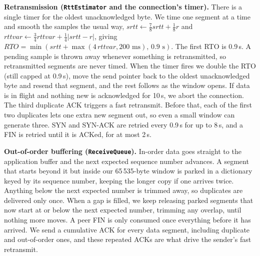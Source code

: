\documentclass[10pt,a4paper]{article}
\newcommand{\cmd}[1]{\texttt{#1}}
\begin{document}
\textbf{Retransmission (\cmd{RttEstimator} and the connection's timer).}
There is a single timer for the oldest unacknowledged byte. We time one segment at a time and
smooth the samples the usual way, $\mathit{srtt}\leftarrow\frac78\mathit{srtt}+\frac18 r$ and
$\mathit{rttvar}\leftarrow\frac34\mathit{rttvar}+\frac14|\mathit{srtt}-r|$, giving
$\mathit{RTO}=\min(\mathit{srtt}+\max(4\,\mathit{rttvar},200\text{ ms}),\,0.9\text{ s})$. The first RTO
is 0.9\,s. A pending sample is thrown away whenever something is retransmitted, so retransmitted
segments are never timed. When the timer fires we double the RTO (still capped at 0.9\,s), move
the send pointer back to the oldest unacknowledged byte and resend that segment, and the rest
follows as the window opens. If data is in flight and nothing new is acknowledged for 10\,s, we
abort the connection. The third duplicate ACK triggers a fast retransmit. Before that, each of the
first two duplicates lets one extra new segment out, so even a small window can generate three.
SYN and SYN-ACK are retried every 0.9\,s for up to 8\,s, and a FIN is retried until it is ACKed,
for at most 2\,s.

\textbf{Out-of-order buffering (\cmd{ReceiveQueue}).}
In-order data goes straight to the application buffer and the next expected sequence number
advances. A segment that starts beyond it but inside our 65\,535-byte window is parked in a
dictionary keyed by its sequence number, keeping the longer copy if one arrives twice. Anything
below the next expected number is trimmed away, so duplicates are delivered only once. When a gap
is filled, we keep releasing parked segments that now start at or below the next expected number,
trimming any overlap, until nothing more moves. A peer FIN is only consumed once everything before
it has arrived. We send a cumulative ACK for every data segment, including duplicate and
out-of-order ones, and these repeated ACKs are what drive the sender's fast retransmit.
\end{document}
